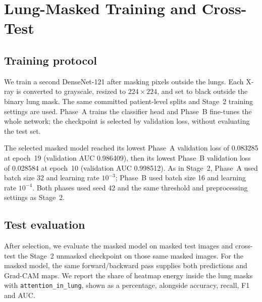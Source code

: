 \section{Lung-Masked Training and Cross-Test}
\label{sec:masking}

\subsection{Training protocol}
We train a second DenseNet-121 after masking pixels outside the lungs. Each X-ray is converted to grayscale,
resized to $224\times224$, and set to black outside the binary lung mask. The same committed patient-level
splits and Stage~2 training settings are used. Phase~A trains the classifier head and Phase~B fine-tunes the
whole network; the checkpoint is selected by validation loss, without evaluating the test set.

The selected masked model reached its lowest Phase~A validation loss of 0.083285 at epoch~19
(validation AUC 0.986409), then its lowest Phase~B validation loss of 0.028584 at epoch~10
(validation AUC 0.998512). As in Stage~2, Phase~A used batch size 32 and learning rate $10^{-3}$;
Phase~B used batch size 16 and learning rate $10^{-4}$. Both phases used seed 42 and the same
threshold and preprocessing settings as Stage~2.

\subsection{Test evaluation}
After selection, we evaluate the masked model on masked test images and cross-test the Stage~2 unmasked
checkpoint on those same masked images. For the masked model, the same forward/backward pass supplies both
predictions and Grad-CAM maps. We report the share of heatmap energy inside the lung masks with
\texttt{attention\_in\_lung}, shown as a percentage, alongside accuracy, recall, F1 and AUC.

